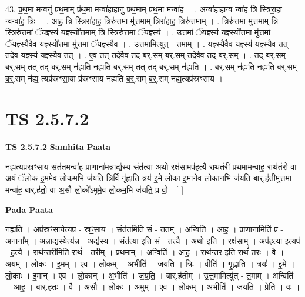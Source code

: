 \documentclass[17pt]{extarticle}
\begin{document}
43. प्र॒थ॒मा मन्वनु॑ प्रथ॒माम् प्र॑थ॒मा मन्वा॑हा॒हानु॑ प्रथ॒माम् प्र॑थ॒मा मन्वा॑ह । . अन्वा॑हा॒हान्व न्वा॑ह॒ त्रि स्त्रिरा॒हा न्वन्वा॑ह॒ त्रिः । . आ॒ह॒ त्रि स्त्रिरा॑हाह॒ त्रिरु॑त्त॒मा मु॑त्त॒माम् त्रिरा॑हाह॒ त्रिरु॑त्त॒माम् । . त्रिरु॑त्त॒मा मु॑त्त॒माम् त्रि स्त्रिरु॑त्त॒मां ॅय॒ज्ञ्स्य॑ य॒ज्ञ्स्यो᳚त्त॒माम् त्रि स्त्रिरु॑त्त॒मां ॅय॒ज्ञ्स्य॑ । . उ॒त्त॒मां ॅय॒ज्ञ्स्य॑ य॒ज्ञ्स्यो᳚त्त॒मा मु॑त्त॒मां ॅय॒ज्ञ्स्यै॒वैव य॒ज्ञ्स्यो᳚त्त॒मा मु॑त्त॒मां ॅय॒ज्ञ्स्यै॒व । . उ॒त्त॒मामित्यु॑त् - त॒माम् । . य॒ज्ञ्स्यै॒वैव य॒ज्ञ्स्य॑ य॒ज्ञ्स्यै॒व तत् तदे॒व य॒ज्ञ्स्य॑ य॒ज्ञ्स्यै॒व तत् । . ए॒व तत् तदे॒वैव तद् ब॒र्॒.सम् ब॒र्॒.सम् तदे॒वैव तद् ब॒र्॒.सम् । . तद् ब॒र्॒.सम् ब॒र्॒.सम् तत् तद् ब॒र्॒.सम् न॑ह्यति नह्यति ब॒र्॒.सम् तत् तद् ब॒र्॒.सम् न॑ह्यति । . ब॒र्॒.सम् न॑ह्यति नह्यति ब॒र्॒.सम् ब॒र्॒.सम् न॑ह्य॒ त्यप्र॑स्रꣳसा॒या प्र॑स्रꣳसाय नह्यति ब॒र्॒.सम् ब॒र्॒.सम् न॑ह्य॒त्यप्र॑स्रꣳसाय । \newline
\pagebreak
{}

\section{ TS 2.5.7.2 }

\textbf{TS 2.5.7.2 } \newline
\textbf{Samhita Paata} \newline

न॑ह्य॒त्यप्र॑स्रꣳसाय॒ संत॑त॒मन्वा॑ह प्रा॒णाना॑म॒न्नाद्य॑स्य॒ संत॑त्या॒ अथो॒ रक्ष॑सा॒मप॑हत्यै॒ राथ॑तंरीं प्रथ॒मामन्वा॑ह॒ राथ॑तंरो॒ वा अ॒यं ॅलो॒क इ॒ममे॒व लो॒कम॒भि ज॑यति॒ त्रिर्वि गृ॑ह्णाति॒ त्रय॑ इ॒मे लो॒का इ॒माने॒व लो॒कान॒भि ज॑यति॒ बार्.ह॑तीमुत्त॒मा-मन्वा॑ह॒ बार्.ह॑तो॒ वा अ॒सौ लो॒को॑ऽमुमे॒व लो॒कम॒भि ज॑यति॒ प्र वो॒ - [  ] \newline

\textbf{Pada Paata} \newline

न॒ह्य॒ति॒ । अप्र॑स्रꣳसा॒येत्यप्र॑ - स्रꣳ॒॒सा॒य॒ । संत॑त॒मिति॒ सं - त॒त॒म् । अन्विति॑ । आ॒ह॒ । प्रा॒णाना॒मिति॑ प्र - अ॒नाना᳚म् । अ॒न्नाद्य॒स्येत्य॑न्न - अद्य॑स्य । संत॑त्या॒ इति॒ सं - त॒त्यै॒ । अथो॒ इति॑ । रक्ष॑साम् । अप॑हत्या॒ इत्यप॑ - ह॒त्यै॒ । राथ॑न्तरी॒मिति॒ राथं᳚ - त॒री॒म् । प्र॒थ॒माम् । अन्विति॑ । आ॒ह॒ । राथ॑न्तर॒ इति॒ राथं᳚-त॒रः॒ । वै । अ॒यम् । लो॒कः । इ॒मम् । ए॒व । लो॒कम् । अ॒भीति॑ । ज॒य॒ति॒ । त्रिः । वीति॑ । गृ॒ह्णा॒ति॒ । त्रयः॑ । इ॒मे । लो॒काः । इ॒मान् । ए॒व । लो॒कान् । अ॒भीति॑ । ज॒य॒ति॒ । बार्.ह॑तीम् । उ॒त्त॒मामित्यु॑त् - त॒माम् । अन्विति॑ । आ॒ह॒ । बार्.ह॑तः । वै । अ॒सौ । लो॒कः । अ॒मुम् । ए॒व । लो॒कम् । अ॒भीति॑ । ज॒य॒ति॒ । प्रेति॑ । वः॒ ।  \newline
\end{document}
